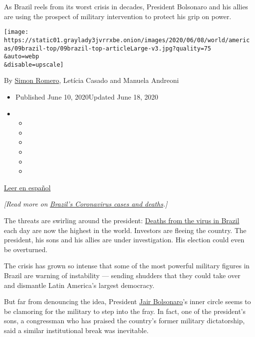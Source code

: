 As Brazil reels from its worst crisis in decades, President Bolsonaro
and his allies are using the prospect of military intervention to
protect his grip on power.

\texttt{[image: https://static01.graylady3jvrrxbe.onion/images/2020/06/08/world/americas/09brazil-top/09brazil-top-articleLarge-v3.jpg?quality=75\\\&auto=webp\\\&disable=upscale]}

By \href{https://www.nytimes3xbfgragh.onion/by/simon-romero}{Simon
Romero}, Letícia Casado and Manuela Andreoni

\begin{itemize}
\item
  Published June 10, 2020Updated June 18, 2020
\item
  \begin{itemize}
  \item
  \item
  \item
  \item
  \item
  \item
  \end{itemize}
\end{itemize}

\href{https://www.nytimes3xbfgragh.onion/es/2020/06/11/espanol/america-latina/bolsonaro-golpe-coronavirus.html}{Leer
en español}

\emph{{[}Read more on}
\href{https://www.nytimes3xbfgragh.onion/article/brazil-coronavirus-cases.html}{\emph{Brazil's
Coronavirus cases and deaths}}\emph{.{]}}

The threats are swirling around the president:
\href{https://www.nytimes3xbfgragh.onion/interactive/2020/world/americas/brazil-coronavirus-cases.html}{Deaths
from the virus in Brazil} each day are now the highest in the world.
Investors are fleeing the country. The president, his sons and his
allies are under investigation. His election could even be overturned.

The crisis has grown so intense that some of the most powerful military
figures in Brazil are warning of instability --- sending shudders that
they could take over and dismantle Latin America's largest democracy.

But far from denouncing the idea, President
\href{https://www.nytimes3xbfgragh.onion/2020/07/07/world/americas/brazil-bolsonaro-coronavirus.html}{Jair
Bolsonaro}'s inner circle seems to be clamoring for the military to step
into the fray. In fact, one of the president's sons, a congressman who
has praised the country's former military dictatorship, said a similar
institutional break was inevitable.

